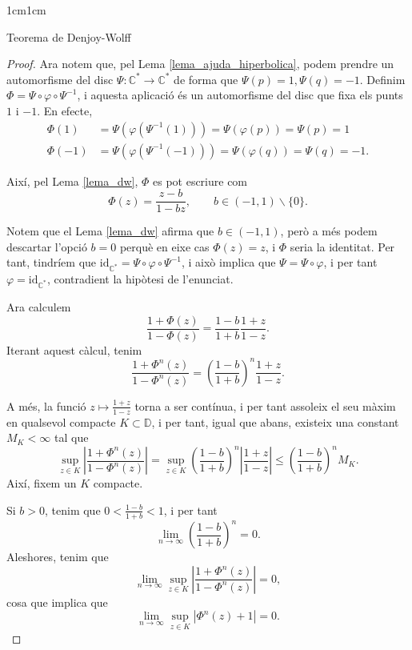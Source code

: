 \begin{adjustwidth}{1cm}{1cm}
\begin{subsection}{Teorema de Denjoy-Wolff}
\begin{proof}
        Ara notem que, pel Lema \ref{lema_ajuda_hiperbolica}, podem prendre un automorfisme del disc $\Psi:\mathbb{C}^*\to \mathbb{C}^*$ de forma que $\Psi(p)=1, \Psi(q)=-1$. Definim $\Phi=\Psi\circ\varphi\circ\Psi^{-1}$, i aquesta aplicació és un automorfisme del disc que fixa els punts $1$ i $-1$. En efecte, 
        \begin{equation*}
            \begin{aligned}
                \Phi(1) &=\Psi(\varphi(\Psi^{-1}(1)))=\Psi(\varphi(p))=\Psi(p)=1 \\
                \Phi(-1) &=\Psi(\varphi(\Psi^{-1}(-1)))=\Psi(\varphi(q))=\Psi(q)=-1.
            \end{aligned}
        \end{equation*}

        Així, pel Lema \ref{lema_dw}, $\Phi$ es pot escriure com 
        \[
            \Phi(z)=\frac{z-b}{1-bz}, \qquad b\in(-1,1)\backslash\{0\}.
        \]

        Notem que el Lema \ref{lema_dw} afirma que $b\in(-1,1)$, però a més podem descartar l'opció $b=0$ perquè en eixe cas $\Phi(z)=z$, i $\Phi$ seria la identitat. Per tant, tindríem que $\operatorname{id_{\mathbb{C}^*}}=\Psi\circ\varphi\circ\Psi^{-1}$, i això implica que $\Psi=\Psi\circ \varphi$, i per tant $\varphi=\operatorname{id_{\mathbb{C}^*}}$, contradient la hipòtesi de l'enunciat. 

        Ara calculem
        \[
            \frac{1+\Phi(z)}{1-\Phi(z)}=\frac{1-b}{1+b}\frac{1+z}{1-z}.
        \]
        Iterant aquest càlcul, tenim
        \[
            \frac{1+\Phi^n(z)}{1-\Phi^n(z)}=\left(\frac{1-b}{1+b}\right)^n \frac{1+z}{1-z}.
        \]

        A més, la funció $z\mapsto \frac{1+z}{1-z}$ torna a ser contínua, i per tant assoleix el seu màxim en qualsevol compacte $K\subset \mathbb{D}$, i per tant, igual que abans, existeix una constant $M_K<\infty$ tal que 
        \[
            \sup_{z\in K}\left|\frac{1+\Phi^n(z)}{1-\Phi^n(z)}\right|=\sup_{z\in K}\left(\frac{1-b}{1+b}\right)^n \left|\frac{1+z}{1-z}\right|\leq\left(\frac{1-b}{1+b}\right)^n M_K.
        \]
        Així, fixem un $K$ compacte.

        Si $b>0$, tenim que $0<\frac{1-b}{1+b}<1$, i per tant 
        \[
            \lim_{n\to \infty}\left(\frac{1-b}{1+b}\right)^n=0.
        \]
        Aleshores, tenim que 
        \[
            \lim_{n\to\infty}\sup_{z\in K}\left|\frac{1+\Phi^n(z)}{1-\Phi^n(z)}\right|=0, 
        \]
        cosa que implica que 
        \[
            \lim_{n\to\infty}\sup_{z\in K}|\Phi^n(z)+1|=0.
        \]


\end{proof}
\end{subsection}
\end{adjustwidth}
